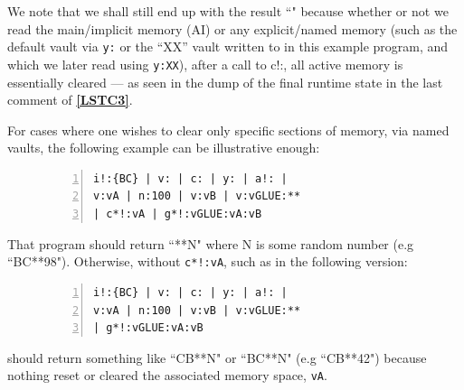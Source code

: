 \documentclass[a4paper, 18pt]{book} %
\begin{document}
We note that we shall still end up with the result ``" because whether or not we read the main/implicit memory (AI) or any explicit/named memory (such as the default vault via \texttt{y:} or the ``XX” vault written to in this example program, and which we later read using \texttt{y:XX}), after a call to c!:, all active memory is essentially cleared --- as seen in the dump of the final runtime state in the last comment of \textbf{\autoref{LSTC3}}.


For cases where one wishes to clear only specific sections of memory, via named vaults, the following example can be illustrative enough:

\begin{figure}[H]
 \Large
  \centering
  \begin{tcolorbox}[teaterminalstyle, title=TEA Program: \texttt{c!:} resets all memory]
  \begin{lstlisting}[language=TEA, caption={TP C4}, label={LSTC4}, numbers=left]
i!:{BC} | v: | c: | y: | a!: |
v:vA | n:100 | v:vB | v:vGLUE:** 
| c*!:vA | g*!:vGLUE:vA:vB
   \end{lstlisting}
  \end{tcolorbox}
\end{figure}

That program should return ``**N" where N is some random number (e.g ``BC**98"). Otherwise, without \texttt{c*!:vA}, such as in the following version:

\begin{figure}[H]
 \Large
  \centering
  \begin{tcolorbox}[teaterminalstyle, title=TEA Program: \texttt{c!:} resets all memory]
  \begin{lstlisting}[language=TEA, caption={TP C5}, label={LSTC5}, numbers=left]
i!:{BC} | v: | c: | y: | a!: | 
v:vA | n:100 | v:vB | v:vGLUE:** 
| g*!:vGLUE:vA:vB
   \end{lstlisting}
  \end{tcolorbox}
\end{figure}

 
 should return something like ``CB**N" or ``BC**N" (e.g ``CB**42") because nothing reset or cleared the associated memory space, \texttt{vA}. 
 
\end{document}
